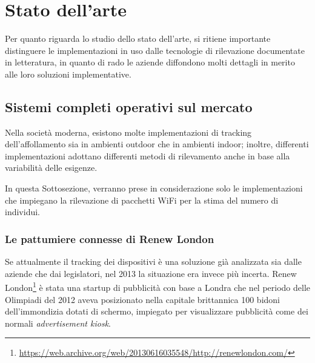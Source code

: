 \section{Stato dell'arte}




Per quanto riguarda lo studio dello stato dell'arte, si ritiene importante distinguere le implementazioni in uso dalle tecnologie di rilevazione documentate in letteratura,
in quanto di rado le aziende diffondono molti dettagli in merito alle loro soluzioni implementative. %

\subsection{Sistemi completi operativi sul mercato}

Nella società moderna, esistono molte implementazioni di tracking dell'affollamento sia in ambienti outdoor che in ambienti indoor;
inoltre, differenti implementazioni adottano differenti metodi di rilevamento anche in base alla variabilità delle esigenze.

In questa Sottosezione, verranno prese in considerazione solo le implementazioni che impiegano la rilevazione di pacchetti WiFi per la stima del numero di individui.

\subsubsection{Le pattumiere connesse di Renew London}

Se attualmente il tracking dei dispositivi è una soluzione già analizzata sia dalle aziende che dai legislatori, nel 2013 la situazione era invece più incerta. %
Renew London\footnote{\url{https://web.archive.org/web/20130616035548/http://renewlondon.com/}} è stata una startup di pubblicità con base a Londra
che nel periodo delle Olimpiadi del 2012 aveva posizionato nella capitale brittannica 100 bidoni dell'immondizia dotati di schermo, impiegato per visualizzare pubblicità come dei normali \textit{advertisement kiosk}.

